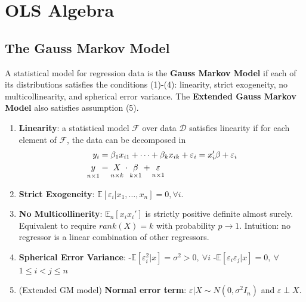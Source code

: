 \documentclass[12pt,]{book}
\providecommand{\tightlist}{%
  \setlength{\itemsep}{0pt}\setlength{\parskip}{0pt}}
\begin{document}
\hypertarget{lecture1}{%
\chapter{OLS Algebra}\label{lecture1}}

\hypertarget{the-gauss-markov-model}{%
\section{The Gauss Markov Model}\label{the-gauss-markov-model}}

A statistical model for regression data is the \textbf{Gauss Markov Model} if each of its distributions satisfies the conditions (1)-(4): linearity, strict exogeneity, no multicollinearity, and spherical error variance. The \textbf{Extended Gauss Markov Model} also satisfies assumption (5).

\begin{enumerate}
\def\labelenumi{\arabic{enumi}.}
\tightlist
\item
  \textbf{Linearity}: a statistical model \(\mathcal{F}\) over data \(\mathcal{D}\) satisfies linearity if for each element of \(\mathcal{F}\), the data can be decomposed in
  \[
   \begin{aligned}
     y_ i &= \beta_ 1 x _ {i1} + \dots + \beta_ k x _ {ik} + \varepsilon_ i = x_ i'\beta + \varepsilon_ i \\
     \underset{n \times 1}{\vphantom{\beta_ \beta} y} &= \underset{n \times k}{\vphantom{\beta}X} \cdot \underset{k \times 1}{\beta} + \underset{n \times 1}{\vphantom{\beta}\varepsilon}
    \end{aligned}
   \]
\item
  \textbf{Strict Exogeneity}: \(\mathbb E [\varepsilon_i|x_1, \dots, x_n] = 0, \forall i\).
\item
  \textbf{No Multicollinerity}: \(\mathbb E_n [x_i x_i']\) is strictly positive definite almost surely. Equivalent to require \(rank(X)=k\) with probability \(p \to 1\).
  Intuition: no regressor is a linear combination of other regressors.
\item
  \textbf{Spherical Error Variance}:
  -\(\mathbb E[\varepsilon_i^2 | x] = \sigma^2 > 0, \ \forall i\)
  -\(\mathbb E [\varepsilon_i \varepsilon_j |x ] = 0, \ \forall\) \(1 \leq i < j \leq n\)
\item
  (Extended GM model) \textbf{Normal error term}: \(\varepsilon|X \sim N(0, \sigma^2 I_n)\) and \(\varepsilon \perp X\).
\end{enumerate}
\end{document}
